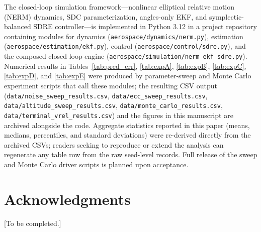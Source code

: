 \documentclass[preprint,3p,times]{elsarticle}
\begin{document}
The closed-loop simulation framework---nonlinear elliptical relative motion (NERM) dynamics, SDC parameterization, angles-only EKF, and symplectic-balanced SDRE controller---is implemented in Python 3.12 in a project repository containing modules for dynamics (\texttt{aerospace/dynamics/nerm.py}), estimation (\texttt{aerospace/estimation/ekf.py}), control (\texttt{aerospace/control/sdre.py}), and the composed closed-loop engine (\texttt{aerospace/simulation/nerm\_ekf\_sdre.py}). Numerical results in Tables~\ref{tab:pred_err}, \ref{tab:expA}, \ref{tab:expB}, \ref{tab:expC}, \ref{tab:expD}, and \ref{tab:expE} were produced by parameter-sweep and Monte Carlo experiment scripts that call these modules; the resulting CSV output (\texttt{data/noise\_sweep\_results.csv}, \texttt{data/ecc\_sweep\_results.csv}, \texttt{data/altitude\_sweep\_results.csv}, \texttt{data/monte\_carlo\_results.csv}, \texttt{data/terminal\_vrel\_results.csv}) and the figures in this manuscript are archived alongside the code. Aggregate statistics reported in this paper (means, medians, percentiles, and standard deviations) were re-derived directly from the archived CSVs; readers seeking to reproduce or extend the analysis can regenerate any table row from the raw seed-level records. Full release of the sweep and Monte Carlo driver scripts is planned upon acceptance.

\section*{Acknowledgments}

[To be completed.]
\end{document}
